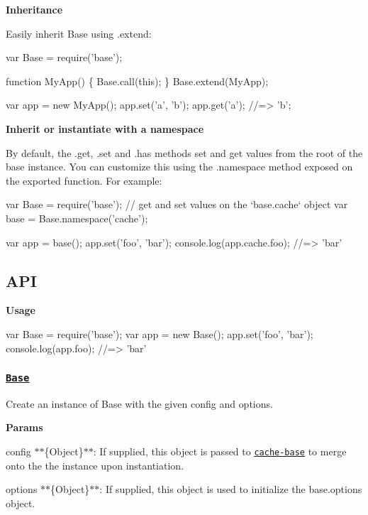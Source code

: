 {\bfseries Inheritance}

Easily inherit Base using {\ttfamily .extend}\+:


\begin{DoxyCode}
var Base = require('base');

function MyApp() \{
  Base.call(this);
\}
Base.extend(MyApp);

var app = new MyApp();
app.set('a', 'b');
app.get('a');
//=> 'b';
\end{DoxyCode}


{\bfseries Inherit or instantiate with a namespace}

By default, the {\ttfamily .get}, {\ttfamily .set} and {\ttfamily .has} methods set and get values from the root of the {\ttfamily base} instance. You can customize this using the {\ttfamily .namespace} method exposed on the exported function. For example\+:


\begin{DoxyCode}
var Base = require('base');
// get and set values on the `base.cache` object
var base = Base.namespace('cache');

var app = base();
app.set('foo', 'bar');
console.log(app.cache.foo);
//=> 'bar'
\end{DoxyCode}


\subsection*{A\+PI}

{\bfseries Usage}


\begin{DoxyCode}
var Base = require('base');
var app = new Base();
app.set('foo', 'bar');
console.log(app.foo);
//=> 'bar'
\end{DoxyCode}


\subsubsection*{\href{index.js#L44}{\tt Base}}

Create an instance of {\ttfamily Base} with the given {\ttfamily config} and {\ttfamily options}.

{\bfseries Params}


\begin{DoxyItemize}
\item {\ttfamily config} $\ast$$\ast$\{Object\}$\ast$$\ast$\+: If supplied, this object is passed to \href{https://github.com/jonschlinkert/cache-base}{\tt cache-\/base} to merge onto the the instance upon instantiation.
\item {\ttfamily options} $\ast$$\ast$\{Object\}$\ast$$\ast$\+: If supplied, this object is used to initialize the {\ttfamily base.\+options} object.
\end{DoxyItemize}

